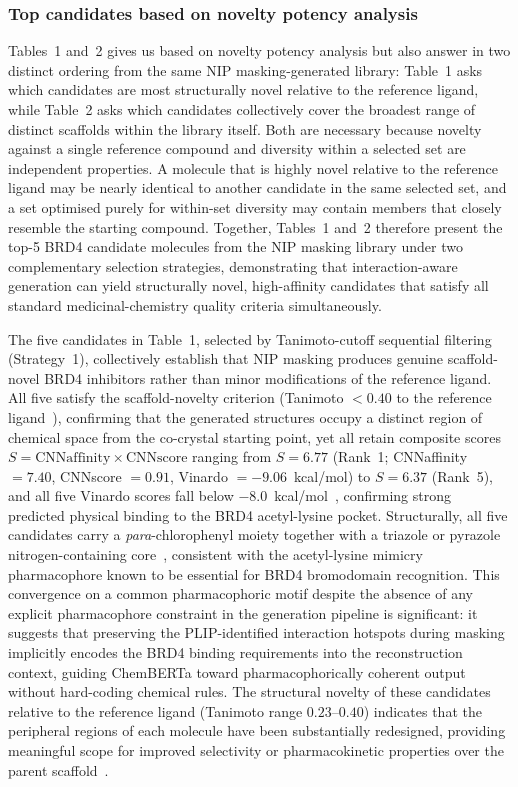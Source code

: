 \documentclass[a4paper,12pt]{article}
\begin{document}
\subsubsection{Top candidates based on novelty potency analysis}
Tables~1 and~2 gives us based on novelty potency analysis but also answer in two distinct ordering from the same
NIP masking-generated library: Table~1 asks which candidates
are most structurally novel relative to the reference ligand,
while Table~2 asks which candidates collectively cover the
broadest range of distinct scaffolds within the library itself.
Both are necessary because novelty against a single reference
compound and diversity within a selected set are independent
properties. A molecule that is highly novel relative to the
reference ligand may be nearly identical to another candidate
in the same selected set, and a set optimised purely for
within-set diversity may contain members that closely resemble
the starting compound.
Together, Tables~1 and~2 therefore present the top-5 BRD4
candidate molecules from the NIP masking library under two
complementary selection strategies, demonstrating that
interaction-aware generation can yield structurally novel,
high-affinity candidates that satisfy all standard
medicinal-chemistry quality criteria simultaneously.
 
The five candidates in Table~1, selected by Tanimoto-cutoff
sequential filtering (Strategy~1), collectively establish that
NIP masking produces genuine scaffold-novel BRD4 inhibitors
rather than minor modifications of the reference ligand.
All five satisfy the scaffold-novelty criterion
(Tanimoto $< 0.40$ to the reference ligand~\cite{maggiora2014}),
confirming that the generated structures occupy a distinct
region of chemical space from the co-crystal starting point,
yet all retain composite scores $S = \text{CNNaffinity} \times
\text{CNNscore}$ ranging from $S = 6.77$ (Rank~1;
CNNaffinity $= 7.40$, CNNscore $= 0.91$,
Vinardo $= -9.06$~kcal/mol) to $S = 6.37$ (Rank~5), and all
five Vinardo scores fall below $-8.0$~kcal/mol~\cite{quiroga2016vinardo},
confirming strong predicted physical binding to the BRD4
acetyl-lysine pocket.
Structurally, all five candidates carry a
\emph{para}-chlorophenyl moiety together with a triazole or
pyrazole nitrogen-containing core~\cite{filippakopoulos2010selective}, consistent with
the acetyl-lysine mimicry pharmacophore known to be essential
for BRD4 bromodomain recognition.
This convergence on a common pharmacophoric motif despite the
absence of any explicit pharmacophore constraint in the
generation pipeline is significant: it suggests that preserving
the PLIP-identified interaction hotspots during masking
implicitly encodes the BRD4 binding requirements into the
reconstruction context, guiding ChemBERTa toward
pharmacophorically coherent output without hard-coding
chemical rules.
The structural novelty of these candidates relative to the
reference ligand (Tanimoto range $0.23$--$0.40$) indicates
that the peripheral regions of each molecule have been
substantially redesigned, providing meaningful scope for
improved selectivity or pharmacokinetic properties over the parent
scaffold~\cite{mcnunn2021gnina}.
 
\end{document}
